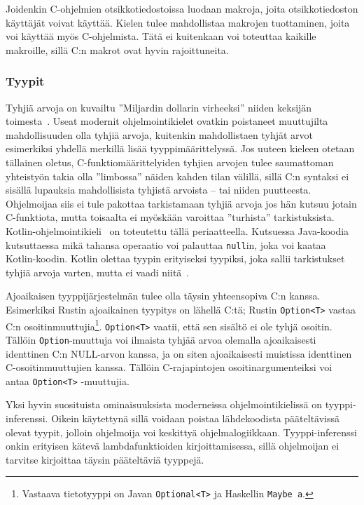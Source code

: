 Joidenkin C-ohjelmien otsikkotiedostoissa luodaan makroja, joita
otsikkotiedoston käyttäjät voivat käyttää. Kielen tulee mahdollistaa makrojen
tuottaminen, joita voi käyttää myös C-ohjelmista. Tätä ei kuitenkaan voi
toteuttaa kaikille makroille, sillä C:n makrot ovat hyvin rajoittuneita.

\subsubsection{Tyypit}

Tyhjiä arvoja on kuvailtu ''Miljardin dollarin virheeksi'' niiden keksijän
toimesta~\citep{billiondollars}. Useat modernit ohjelmointikielet ovatkin
poistaneet muuttujilta mahdollisuuden olla tyhjiä arvoja, kuitenkin
mahdollistaen tyhjät arvot esimerkiksi yhdellä merkillä lisää
tyyppimäärittelyssä. Jos uuteen kieleen otetaan tällainen oletus,
C-funktiomäärittelyiden tyhjien arvojen tulee saumattoman yhteistyön takia olla
''limbossa'' näiden kahden tilan välillä, sillä C:n syntaksi ei sisällä
lupauksia mahdollisista tyhjistä arvoista -- tai niiden puutteesta. Ohjelmoijaa
siis ei tule pakottaa tarkistamaan tyhjiä arvoja jos hän kutsuu jotain
C-funktiota, mutta toisaalta ei myöskään varoittaa ''turhista'' tarkistuksista.
Kotlin-ohjelmointikieli~\citep{kotlin} on toteutettu tällä periaatteella.
Kutsuessa Java-koodia kutsuttaessa mikä tahansa operaatio voi palauttaa
\texttt{null}in, joka voi kaataa Kotlin-koodin. Kotlin olettaa tyypin
erityiseksi tyypiksi, joka sallii tarkistukset tyhjiä arvoja varten, mutta ei
vaadi niitä~\citep{kotlinnullability}.

Ajoaikaisen tyyppijärjestelmän tulee olla täysin yhteensopiva C:n kanssa.
Esimerkiksi Rustin ajoaikainen tyypitys on lähellä C:tä; Rustin
\texttt{Option<T>} vastaa C:n osoitinmuuttujia\footnote{Vastaava tietotyyppi on
Javan \texttt{Optional<T>} ja Haskellin \texttt{Maybe a}.}. \texttt{Option<T>}
vaatii, että sen sisältö ei ole tyhjä osoitin. Tällöin \texttt{Option}-muuttuja voi ilmaista tyhjää
arvoa olemalla ajoaikaisesti identtinen C:n NULL-arvon kanssa, ja on siten
ajoaikaisesti muistissa identtinen C-osoitinmuuttujien kanssa. Tällöin
C-rajapintojen osoitinargumenteiksi voi antaa \texttt{Option<T>} -muuttujia.

Yksi hyvin suosituista ominaisuuksista moderneissa ohjelmointikielissä on
tyyppi-inferenssi. Oikein käytettynä sillä voidaan poistaa lähdekoodista
pääteltävissä olevat tyypit, jolloin ohjelmoija voi keskittyä ohjelmalogiikkaan.
Tyyppi-inferenssi onkin erityisen kätevä lambdafunktioiden kirjoittamisessa,
sillä ohjelmoijan ei tarvitse kirjoittaa täysin pääteltäviä tyyppejä.

